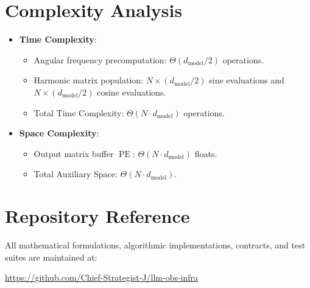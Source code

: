 \documentclass[11pt,a4paper]{article}
\theoremstyle{definition}
\begin{document}
\section{Complexity Analysis}
\begin{itemize}
    \item \textbf{Time Complexity}:
    \begin{itemize}
        \item Angular frequency precomputation: $\Theta(d_{\text{model}}/2)$ operations.
        \item Harmonic matrix population: $N \times (d_{\text{model}}/2)$ sine evaluations and $N \times (d_{\text{model}}/2)$ cosine evaluations.
        \item Total Time Complexity: $\Theta(N \cdot d_{\text{model}})$ operations.
    \end{itemize}
    \item \textbf{Space Complexity}:
    \begin{itemize}
        \item Output matrix buffer $\operatorname{PE}$: $\Theta(N \cdot d_{\text{model}})$ floats.
        \item Total Auxiliary Space: $\Theta(N \cdot d_{\text{model}})$.
    \end{itemize}
\end{itemize}

\section{Repository Reference}
All mathematical formulations, algorithmic implementations, contracts, and test suites are maintained at:
\begin{center}
\url{https://github.com/Chief-Strategist-J/llm-obs-infra}
\end{center}
\end{document}
